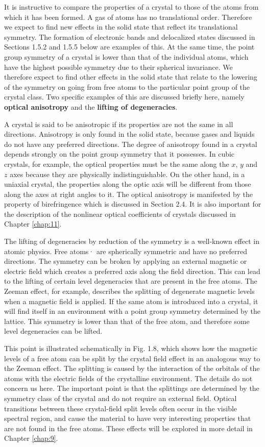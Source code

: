 \documentclass[12pt]{book}
\begin{document}
It is instructive to compare the properties of a crystal to those of the atoms from which it has been formed. A gas of atoms has no translational order. Therefore we expect to find new effects in the solid state that reflect its translational symmetry. The formation of electronic bands and delocalized states discussed in Sections 1.5.2 and 1.5.5 below are examples of this. At the same time, the point group symmetry of a crystal is lower than that of the individual atoms, which have the highest possible symmetry due to their spherical invariance. We therefore expect to find other effects in the solid state that relate to the lowering of the symmetry on going from free atoms to the particular point group of the crystal class. Two specific examples of this are discussed briefly here, namely \textbf{optical anisotropy} and the \textbf{lifting of degeneracies}.

A crystal is said to be anisotropic if its properties are not the same in all directions. Anisotropy is only found in the solid state, because gases and liquids do not have any preferred directions. The degree of anisotropy found in a crystal depends strongly on the point group symmetry that it possesses. In cubic crystals, for example, the optical properties must be the same along the $x$, $y$ and $z$ axes because they are physically indistinguishable. On the other hand, in a uniaxial crystal, the properties along the optic axis will be different from those along the axes at right angles to it. The optical anisotropy is manifested by the property of birefringence which is discussed in Section 2.4. It is also important for the description of the nonlinear optical coefficients of crystals discussed in Chapter \ref{chap:11}.

The lifting of degeneracies by reduction of the symmetry is a well-known effect in atomic physics. Free atoms· are spherically symmetric and have no preferred directions. The symmetry can be broken by applying an external magnetic or electric field which creates a preferred axis along the field direction. This can lead to the lifting of certain level degeneracies that are present in the free atoms. The Zeeman effect, for example, describes the splitting of degenerate magnetic levels when a magnetic field is applied. If the same atom is introduced into a crystal, it will find itself in an environment with a point group symmetry determined by the lattice. This symmetry is lower than that of the free atom, and therefore some level degeneracies can be lifted.

This point is illustrated schematically in Fig. 1.8, which shows how the magnetic levels of a free atom can be split by the crystal field effect in an analogous way to the Zeeman effect. The splitting is caused by the interaction of the orbitals of the atoms with the electric fields of the crystalline environment. The details do not concern us here. The important point is that the splittings are determined by the symmetry class of the crystal and do not require an external field. Optical transitions between these crystal-field split levels often occur in the visible spectral region, and cause the material to have very interesting properties that are not found in the free atoms. These effects will be explored in more detail in Chapter \ref{chap:9}.
\end{document}

